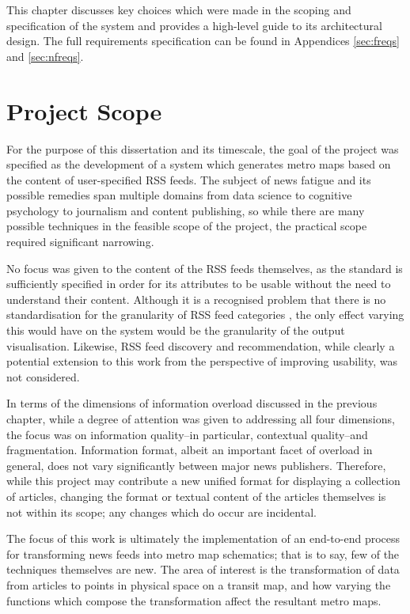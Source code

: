 This chapter discusses key choices which were made in the scoping and specification of the system and provides a high-level guide to its architectural design. The full requirements specification can be found in Appendices \ref{sec:freqs} and \ref{sec:nfreqs}.

\section{Project Scope}

For the purpose of this dissertation and its timescale, the goal of the project was specified as the development of a system which generates metro maps based on the content of user-specified RSS feeds. The subject of news fatigue and its possible remedies span multiple domains from data science to cognitive psychology to journalism and content publishing, so while there are many possible techniques in the feasible scope of the project, the practical scope required significant narrowing.

No focus was given to the content of the RSS feeds themselves, as the standard is sufficiently specified in order for its attributes to be usable without the need to understand their content. Although it is a recognised problem that there is no standardisation for the granularity of RSS feed categories \citep{PersonalNewsRss}, the only effect varying this would have on the system would be the granularity of the output visualisation. Likewise, RSS feed discovery and recommendation, while clearly a potential extension to this work from the perspective of improving usability, was not considered.

In terms of the dimensions of information overload \citep{TowardsAnOptimalResolutionToInformationOverload} discussed in the previous chapter, while a degree of attention was given to addressing all four dimensions, the focus was on information quality--in particular, contextual quality--and fragmentation. Information format, albeit an important facet of overload in general, does not vary significantly between major news publishers. Therefore, while this project may contribute a new unified format for displaying a collection of articles, changing the format or textual content of the articles themselves is not within its scope; any changes which do occur are incidental.

The focus of this work is ultimately the implementation of an end-to-end process for transforming news feeds into metro map schematics; that is to say, few of the techniques themselves are new. The area of interest is the transformation of data from articles to points in physical space on a transit map, and how varying the functions which compose the transformation affect the resultant metro maps.

